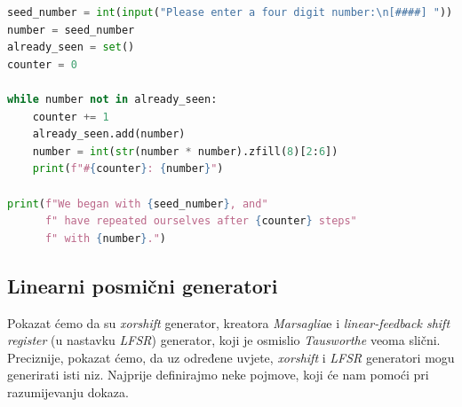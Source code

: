 \documentclass[10pt]{scrartcl}
\newcommand\foreign[1]{\textit{#1}}
\begin{document}
\begin{lstlisting}[language=Python]
seed_number = int(input("Please enter a four digit number:\n[####] "))
number = seed_number
already_seen = set()
counter = 0

while number not in already_seen:
    counter += 1
    already_seen.add(number)
    number = int(str(number * number).zfill(8)[2:6]) 
    print(f"#{counter}: {number}")

print(f"We began with {seed_number}, and"
      f" have repeated ourselves after {counter} steps"
      f" with {number}.")
\end{lstlisting}

\subsection{Linearni posmični generatori}
Pokazat ćemo da su \foreign{xorshift} generator, kreatora \foreign{Marsaglia}e i \foreign{linear-feedback shift register} (u nastavku \foreign{LFSR}) generator, koji je osmislio \foreign{Tausworthe} veoma slični. Preciznije, pokazat ćemo, da uz određene uvjete, \foreign{xorshift} i \foreign{LFSR} generatori mogu generirati isti niz. Najprije definirajmo neke pojmove, koji će nam pomoći pri razumijevanju dokaza.
\end{document}
